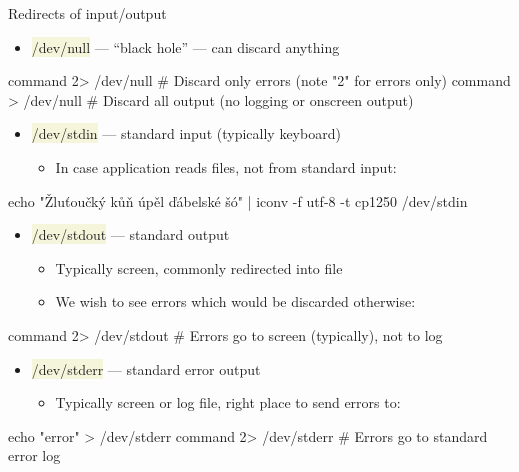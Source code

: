\documentclass[compress, xelatex, 11pt, xcolor=svgnames, aspectratio=169, url={hyphens, lowtilde}]{beamer}
\renewcommand{\texttt}[1]{\colorbox{Beige}{{\ttfamily #1}}}
\begin{document}
\begin{frame}[fragile]{Redirects of input/output}
	\label{pipe}
	\begin{itemize}
		\item \texttt{/dev/null} --- \enquote{black hole} --- can discard anything
	\end{itemize}
	\begin{bashcode}
    command 2> /dev/null # Discard only errors (note "2" for errors only)
    command > /dev/null # Discard all output (no logging or onscreen output)
	\end{bashcode}
	\begin{itemize}
		\item \texttt{/dev/stdin} --- standard input (typically keyboard)
		\begin{itemize}
			\item In case application reads files, not from standard input:
		\end{itemize}
	\end{itemize}
	\begin{bashcode}
    echo "Žluťoučký kůň úpěl ďábelské šó" | iconv -f utf-8 -t cp1250 /dev/stdin
	\end{bashcode}
	\begin{itemize}
		\item \texttt{/dev/stdout} --- standard output
		\begin{itemize}
			\item Typically screen, commonly redirected into file
			\item We wish to see errors which would be discarded otherwise:
		\end{itemize}
	\end{itemize}
	\begin{bashcode}
    command 2> /dev/stdout # Errors go to screen (typically), not to log
	\end{bashcode}
	\begin{itemize}
		\item \texttt{/dev/stderr} --- standard error output
		\begin{itemize}
			\item Typically screen or log file, right place to send errors to:
		\end{itemize}
	\end{itemize}
	\begin{bashcode}
    echo "error" > /dev/stderr
    command 2> /dev/stderr # Errors go to standard error log
	\end{bashcode}
\end{frame}
\end{document}
